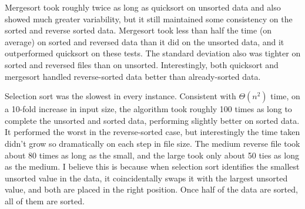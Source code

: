 \documentclass{article}
\begin{document}
Mergesort took roughly twice as long as quicksort on unsorted data and also showed much greater variability, but it still maintained some consistency on the sorted and reverse sorted data.  Mergesort took less than half the time (on average) on sorted and reversed data than it did on the unsorted data, and it outperformed quicksort on these tests.  The standard deviation also was tighter on sorted and reversed files than on unsorted.  Interestingly, both quicksort and mergesort handled reverse-sorted data better than already-sorted data.  

Selection sort was the slowest in every instance.  Consistent with $\Theta(n^2)$ time, on a 10-fold increase in input size, the algorithm took roughly 100 times as long to complete the unsorted and sorted data, performing slightly better on sorted data.  It performed the worst in the reverse-sorted case, but interestingly the time taken didn't grow so dramatically on each step in file size.  The medium reverse file took about 80 times as long as the small, and the large took only about 50 ties as long as the medium.  I believe this is because when selection sort identifies the smallest unsorted value in the data, it coincidentally swaps it with the largest unsorted value, and both are placed in the right position.  Once half of the data are sorted, all of them are sorted.  
\end{document}
